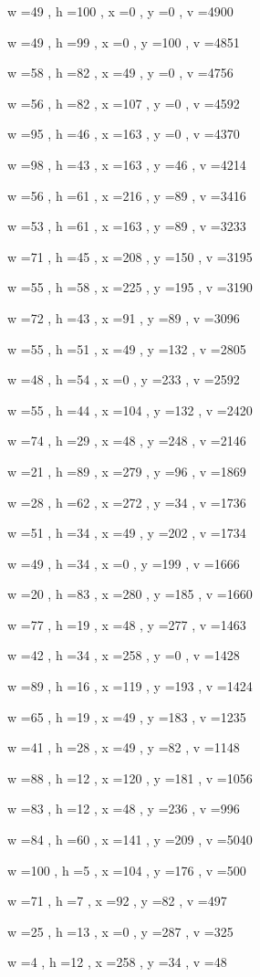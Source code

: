 \documentclass[11pt]{article}
\begin{document}
w =49 , h =100 , x =0 , y =0 , v =4900
\par
w =49 , h =99 , x =0 , y =100 , v =4851
\par
w =58 , h =82 , x =49 , y =0 , v =4756
\par
w =56 , h =82 , x =107 , y =0 , v =4592
\par
w =95 , h =46 , x =163 , y =0 , v =4370
\par
w =98 , h =43 , x =163 , y =46 , v =4214
\par
w =56 , h =61 , x =216 , y =89 , v =3416
\par
w =53 , h =61 , x =163 , y =89 , v =3233
\par
w =71 , h =45 , x =208 , y =150 , v =3195
\par
w =55 , h =58 , x =225 , y =195 , v =3190
\par
w =72 , h =43 , x =91 , y =89 , v =3096
\par
w =55 , h =51 , x =49 , y =132 , v =2805
\par
w =48 , h =54 , x =0 , y =233 , v =2592
\par
w =55 , h =44 , x =104 , y =132 , v =2420
\par
w =74 , h =29 , x =48 , y =248 , v =2146
\par
w =21 , h =89 , x =279 , y =96 , v =1869
\par
w =28 , h =62 , x =272 , y =34 , v =1736
\par
w =51 , h =34 , x =49 , y =202 , v =1734
\par
w =49 , h =34 , x =0 , y =199 , v =1666
\par
w =20 , h =83 , x =280 , y =185 , v =1660
\par
w =77 , h =19 , x =48 , y =277 , v =1463
\par
w =42 , h =34 , x =258 , y =0 , v =1428
\par
w =89 , h =16 , x =119 , y =193 , v =1424
\par
w =65 , h =19 , x =49 , y =183 , v =1235
\par
w =41 , h =28 , x =49 , y =82 , v =1148
\par
w =88 , h =12 , x =120 , y =181 , v =1056
\par
w =83 , h =12 , x =48 , y =236 , v =996
\par
w =84 , h =60 , x =141 , y =209 , v =5040
\par
w =100 , h =5 , x =104 , y =176 , v =500
\par
w =71 , h =7 , x =92 , y =82 , v =497
\par
w =25 , h =13 , x =0 , y =287 , v =325
\par
w =4 , h =12 , x =258 , y =34 , v =48
\par
\newpage
\end{document}
